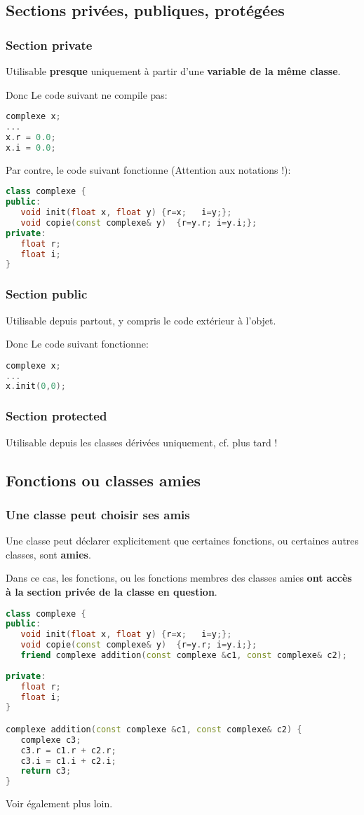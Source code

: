\documentclass{beamer}
\begin{document}
\subsection{Sections privées, publiques, protégées}

\begin{frame}[fragile=singleslide,shrink=20]
\frametitle {Section private}
Utilisable \textbf{presque} uniquement à partir d'une \textbf{variable de la même classe}.

Donc Le code suivant ne compile pas:
\begin{lstlisting}[language=c++]
complexe x;
...
x.r = 0.0;
x.i = 0.0;
\end{lstlisting}

Par contre, le code suivant fonctionne (Attention aux notations !):
\begin{lstlisting}[language=c++]
class complexe {
public:
   void init(float x, float y) {r=x;   i=y;};
   void copie(const complexe& y)  {r=y.r; i=y.i;};
private:
   float r;
   float i;
}   
\end{lstlisting}
\end{frame}

\begin{frame}[fragile=singleslide,shrink=20]
\frametitle {Section public}
Utilisable depuis partout, y compris le code extérieur à l'objet.

Donc Le code suivant fonctionne:
\begin{lstlisting}[language=c++]
complexe x;
...
x.init(0,0);
\end{lstlisting}
\end{frame}

\begin{frame}[fragile=singleslide,shrink=20]
\frametitle {Section protected}
Utilisable depuis les classes dérivées uniquement, cf. plus tard !
\end{frame}

\subsection{Fonctions ou classes amies}

\begin{frame}[fragile=singleslide,shrink=20]
\frametitle {Une classe peut choisir ses amis}
Une classe peut déclarer explicitement que certaines fonctions, ou certaines autres classes, sont \textbf{amies}.

Dans ce cas, les fonctions, ou les fonctions membres des classes amies \textbf{ont accès à la section privée de la classe en question}.
\begin{lstlisting}[language=c++]
class complexe {
public:
   void init(float x, float y) {r=x;   i=y;};
   void copie(const complexe& y)  {r=y.r; i=y.i;};
   friend complexe addition(const complexe &c1, const complexe& c2);
   
private:
   float r;
   float i;
}  

complexe addition(const complexe &c1, const complexe& c2) {
   complexe c3;
   c3.r = c1.r + c2.r;
   c3.i = c1.i + c2.i;
   return c3;
}
\end{lstlisting}

Voir également plus loin.
\end{frame}
\end{document}
